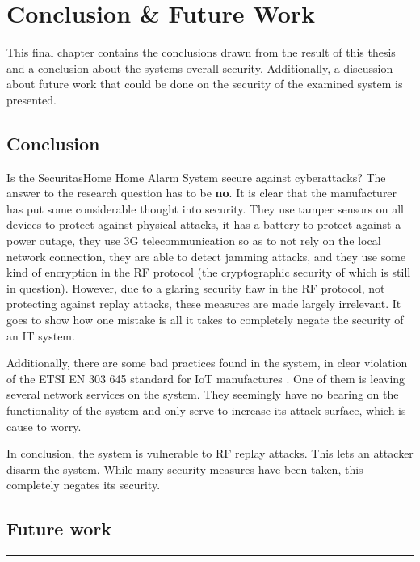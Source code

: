 \chapter{Conclusion \& Future Work} \label{ch:conclusion}
This final chapter contains the conclusions drawn from the result of this thesis and a conclusion about the systems overall security. Additionally, a discussion about future work that could be done on the security of the examined system is presented.

\section{Conclusion}
Is the SecuritasHome Home Alarm System secure against cyberattacks? The answer to the research question has to be \textbf{no}. It is clear that the manufacturer has put some considerable thought into security. They use tamper sensors on all devices to protect against physical attacks, it has a battery to protect against a power outage, they use 3G telecommunication so as to not rely on the local network connection, they are able to detect jamming attacks, and they use some kind of encryption in the RF protocol (the cryptographic security of which is still in question). However, due to a glaring security flaw in the RF protocol, not protecting against replay attacks, these measures are made largely irrelevant. It goes to show how one mistake is all it takes to completely negate the security of an IT system.

Additionally, there are some bad practices found in the system, in clear violation of the ETSI EN 303 645 standard for IoT manufactures \cite{etsi-iot-standard}. One of them is leaving several network services on the system. They seemingly have no bearing on the functionality of the system and only serve to increase its attack surface, which is cause to worry.

In conclusion, the system is vulnerable to RF replay attacks. This lets an attacker disarm the system. While many security measures have been taken, this completely negates its security.

\section{Future work} \label{ch:conclusion:related-work}
\todo

\noindent\rule{\textwidth}{0.4mm}
